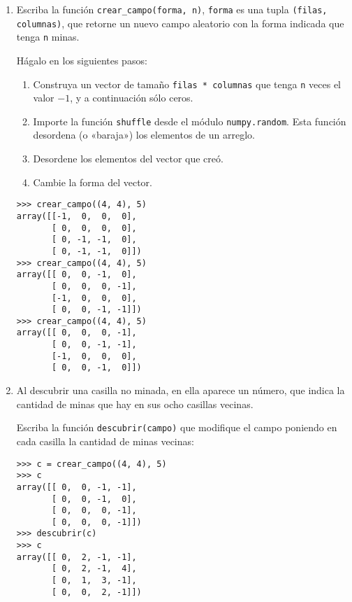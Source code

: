 \begin{enumerate}
\item
  Escriba la función \lstinline!crear_campo(forma, n)!,
  \lstinline!forma! es una tupla \lstinline!(filas, columnas)!, que
  retorne un nuevo campo aleatorio con la forma indicada que tenga
  \lstinline!n! minas.

  Hágalo en los siguientes pasos:

  \begin{enumerate}%
  \item
    Construya un vector de tamaño \lstinline!filas * columnas! que tenga
    \lstinline!n! veces el valor \(-1\), y a continuación sólo ceros.
  \item
    Importe la función \lstinline!shuffle! desde el módulo
    \lstinline!numpy.random!. Esta función desordena (o «baraja») los
    elementos de un arreglo.
  \item
    Desordene los elementos del vector que creó.
  \item
    Cambie la forma del vector.
  \end{enumerate}

\begin{lstlisting}
>>> crear_campo((4, 4), 5)
array([[-1,  0,  0,  0],
       [ 0,  0,  0,  0],
       [ 0, -1, -1,  0],
       [ 0, -1, -1,  0]])
>>> crear_campo((4, 4), 5)
array([[ 0,  0, -1,  0],
       [ 0,  0,  0, -1],
       [-1,  0,  0,  0],
       [ 0,  0, -1, -1]])
>>> crear_campo((4, 4), 5)
array([[ 0,  0,  0, -1],
       [ 0,  0, -1, -1],
       [-1,  0,  0,  0],
       [ 0,  0, -1,  0]])
\end{lstlisting}
\item
  Al descubrir una casilla no minada, en ella aparece un número, que
  indica la cantidad de minas que hay en sus ocho casillas vecinas.

  Escriba la función \lstinline!descubrir(campo)! que modifique el campo
  poniendo en cada casilla la cantidad de minas vecinas:

\begin{lstlisting}
>>> c = crear_campo((4, 4), 5)
>>> c
array([[ 0,  0, -1, -1],
       [ 0,  0, -1,  0],
       [ 0,  0,  0, -1],
       [ 0,  0,  0, -1]])
>>> descubrir(c)
>>> c
array([[ 0,  2, -1, -1],
       [ 0,  2, -1,  4],
       [ 0,  1,  3, -1],
       [ 0,  0,  2, -1]])
\end{lstlisting}
\end{enumerate}

